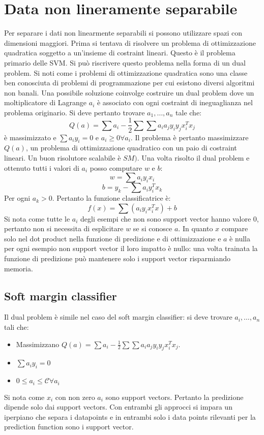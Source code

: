 \section{Data non lineramente separabile}
Per separare i dati non linearmente separabili si possono utilizzare spazi con dimensioni maggiori.
Prima si tentava di risolvere un problema di ottimizzazione quadratica soggetto a un'insieme di costraint lineari.
Questo \`e il problema primario delle SVM.
Si pu\`o riscrivere questo problema nella forma di un dual problem.
Si noti come i problemi di ottimizzazione quadratica sono una classe ben conosciuta di problemi di programmazione per cui esistono diversi algoritmi non banali.
Una possibile soluzione coinvolge costruire un dual problem dove un moltiplicatore di Lagrange $a_i$ \`e associato con ogni costraint di ineguaglianza nel problema originario.
Si deve pertanto trovare $a_1,\dots,a_n$ tale che:
$$Q(a) = \sum a_i - \frac{1}{2}\sum\sum a_ia_jy_iy_jx_i^Tx_j$$
\`e massimizzato e $\sum a_iy_i = 0$ e $a_i\ge 0\forall a_i$.
Il problema \`e pertanto massimizzare $Q(a)$, un problema di ottimizzazione quadratico con un paio di costraint lineari.
Un buon risolutore scalabile \`e $SM)$.
Una volta risolto il dual problem e ottenuto tutti i valori di $a_i$ posso computare $w$ e $b$:
$$w=\sum a_iy_ix_i$$
$$b = y_k - \sum a_iy_i^Tx_k$$
Per ogni $a_k>0$.
Pertanto la funzione classificatrice \`e:
$$f(x) = \sum(a_iy_ix_i^Tx)+b$$
Si nota come tutte le $a_i$ degli esempi che non sono support vector hanno valore $0$, pertanto non si necessita di esplicitare $w$ se si conosce $a$.
In quanto $x$ compare solo nel dot product nella funzione di predizione e di ottimizzazione e $a$ \`e nulla per ogni esempio non support vector il loro impatto \`e nullo: una volta trainata la funzione di predizione pu\`o mantenere solo i support vector risparmiando memoria.

	\subsection{Soft margin classifier}
	Il dual problem \`e simile nel caso del soft margin classifier: si deve trovare $a_i,\dots, a_n$ tali che:
	\begin{itemize}
		\item Massimizzano $Q(a) = \sum a_i-\frac{1}{2}\sum\sum a_ia_jy_iy_jx_i^Tx_j$.
		\item $\sum a_iy_i = 0$
		\item $0\le a_i\le \mathcal{C}\forall a_i$
	\end{itemize}
	Si nota come $x_i$ con non zero $a_i$ sono support vectors.
	Pertanto la predizione dipende solo dai support vectors.
	Con entrambi gli approcci si impara un iperpiano che separa i datapoints e in entrambi solo i data points rilevanti per la prediction function sono i support vector.

